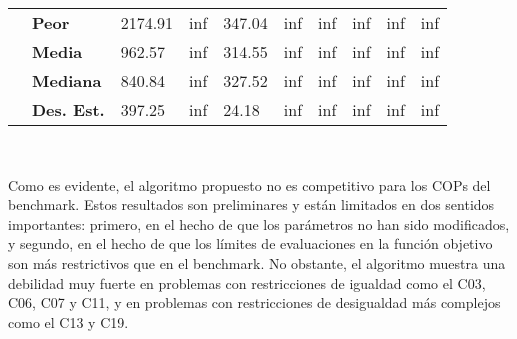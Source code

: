 \documentclass{article}
\begin{document}
\begin{table}[h!]
\begin{tabular}{|c|l|l|l|l|l|l|l|l|l|}
                                                   & \textbf{Peor}                             & 2174.91                           & inf                               & 347.04                            & inf                               & inf                               & inf                               & inf                               & inf                               \\ \cline{2-10} 
                                                   & \textbf{Media}                            & 962.57                            & inf                               & 314.55                            & inf                               & inf                               & inf                               & inf                               & inf                               \\ \cline{2-10} 
                                                   & \textbf{Mediana}                          & 840.84                            & inf                               & 327.52                            & inf                               & inf                               & inf                               & inf                               & inf                               \\ \cline{2-10} 
                                                   & \textbf{Des. Est.}                        & 397.25                            & inf                               & 24.18                             & inf                               & inf                               & inf                               & inf                               & inf                               \\ \hline
\end{tabular}
\end{table}

\

Como es evidente, el algoritmo propuesto no es competitivo para los COPs del benchmark. Estos resultados son preliminares y están limitados en dos sentidos importantes: primero, en el hecho de que los parámetros no han sido modificados, y segundo, en el hecho de que los límites de evaluaciones en la función objetivo son más restrictivos que en el benchmark. No obstante, el algoritmo muestra una debilidad muy fuerte en problemas con restricciones de igualdad como el C03, C06, C07 y C11, y en problemas con restricciones de desigualdad más complejos como el C13 y C19. 

\
\end{document}
